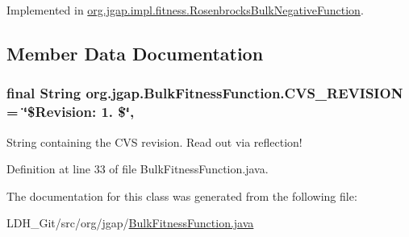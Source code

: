 Implemented in \hyperlink{classorg_1_1jgap_1_1impl_1_1fitness_1_1_rosenbrocks_bulk_negative_function_ad5b5b0c55e81266cf47abbed3069f470}{org.\-jgap.\-impl.\-fitness.\-Rosenbrocks\-Bulk\-Negative\-Function}.



\subsection{Member Data Documentation}
\hypertarget{classorg_1_1jgap_1_1_bulk_fitness_function_a2cf877b42f4607be78def1b50cb0008f}{
\subsubsection[{C\-V\-S\-\_\-\-R\-E\-V\-I\-S\-I\-O\-N}]{\setlength{\rightskip}{0pt plus 5cm}final String org.\-jgap.\-Bulk\-Fitness\-Function.\-C\-V\-S\-\_\-\-R\-E\-V\-I\-S\-I\-O\-N = \char`\"{}\$Revision\-: 1. \$\char`\"{}\hspace{0.3cm}{\ttfamily [static]}, {\ttfamily [private]}}}\label{classorg_1_1jgap_1_1_bulk_fitness_function_a2cf877b42f4607be78def1b50cb0008f}
String containing the C\-V\-S revision. Read out via reflection! 

Definition at line 33 of file Bulk\-Fitness\-Function.\-java.



The documentation for this class was generated from the following file\-:\begin{DoxyCompactItemize}
\item 
L\-D\-H\-\_\-\-Git/src/org/jgap/\hyperlink{_bulk_fitness_function_8java}{Bulk\-Fitness\-Function.\-java}\end{DoxyCompactItemize}
